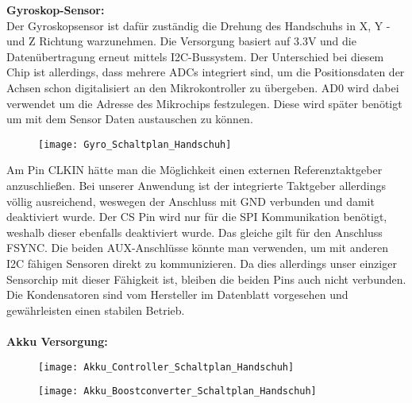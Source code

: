 \documentclass[11pt]{article}
\begin{document}
\textbf{Gyroskop-Sensor:}
\\
Der Gyroskopsensor ist dafür zuständig die Drehung des Handschuhs in X, Y -und Z Richtung warzunehmen. Die Versorgung basiert 
auf 3.3V und die Datenübertragung erneut mittels I2C-Bussystem. Der Unterschied bei diesem Chip ist allerdings, dass mehrere ADCs
integriert sind, um die Positionsdaten der Achsen schon digitalisiert an den Mikrokontroller zu übergeben. AD0 wird dabei verwendet
um die Adresse des Mikrochips festzulegen. Diese wird später benötigt um mit dem Sensor Daten austauschen zu können.
\\
\begin{figure}[H]
	\begin{center}
		\scalebox{0.5}
		{\texttt{[image: Gyro\_Schaltplan\_Handschuh]}}
	\end{center}
\end{figure}
Am Pin CLKIN hätte man die Möglichkeit einen externen Referenztaktgeber anzuschließen. Bei unserer Anwendung ist der integrierte 
Taktgeber allerdings völlig ausreichend, weswegen der Anschluss mit GND verbunden und damit deaktiviert wurde. Der CS Pin wird nur
für die SPI Kommunikation benötigt, weshalb dieser ebenfalls deaktiviert wurde. Das gleiche gilt für den Anschluss FSYNC. Die beiden
AUX-Anschlüsse könnte man verwenden, um mit anderen I2C fähigen Sensoren direkt zu kommunizieren. Da dies allerdings unser einziger
Sensorchip mit dieser Fähigkeit ist, bleiben die beiden Pins auch nicht verbunden. Die Kondensatoren sind vom Hersteller im Datenblatt
vorgesehen und gewährleisten einen stabilen Betrieb. \\
\\
\textbf{Akku Versorgung:}
\\
\begin{figure}[H]
	\begin{center}
		\scalebox{0.5}
		{\texttt{[image: Akku\_Controller\_Schaltplan\_Handschuh]}}
	\end{center}
\end{figure}

\begin{figure}[H]
	\begin{center}
		\scalebox{0.5}
		{\texttt{[image: Akku\_Boostconverter\_Schaltplan\_Handschuh]}}
	\end{center}
\end{figure}
\end{document}
